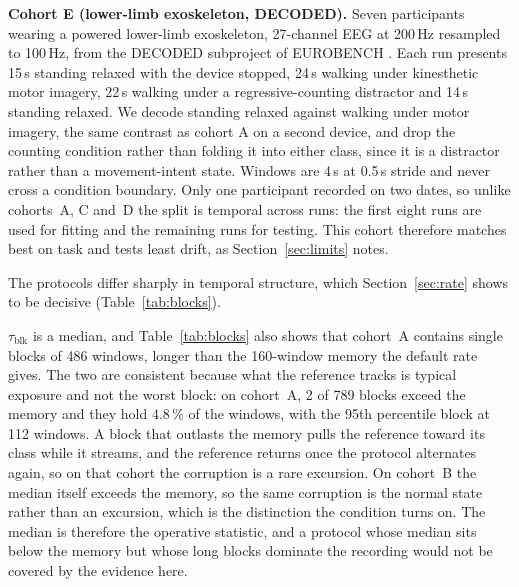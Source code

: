 \documentclass[a4paper,fleqn]{cas-dc}
\begin{document}
\textbf{Cohort E (lower-limb exoskeleton, DECODED).} Seven participants wearing a powered lower-limb exoskeleton, 27-channel EEG at 200\,Hz resampled to 100\,Hz, from the DECODED subproject of EUROBENCH \citep{decoded}. Each run presents 15\,s standing relaxed with the device stopped, 24\,s walking under kinesthetic motor imagery, 22\,s walking under a regressive-counting distractor and 14\,s standing relaxed. We decode standing relaxed against walking under motor imagery, the same contrast as cohort A on a second device, and drop the counting condition rather than folding it into either class, since it is a distractor rather than a movement-intent state. Windows are 4\,s at 0.5\,s stride and never cross a condition boundary. Only one participant recorded on two dates, so unlike cohorts~A, C and~D the split is temporal across runs: the first eight runs are used for fitting and the remaining runs for testing. This cohort therefore matches best on task and tests least drift, as Section~\ref{sec:limits} notes.

The protocols differ sharply in temporal structure, which
Section~\ref{sec:rate} shows to be decisive (Table~\ref{tab:blocks}).

$\tau_{\mathrm{blk}}$ is a median, and Table~\ref{tab:blocks} also shows that
cohort~A contains single blocks of 486 windows, longer than the 160-window
memory the default rate gives. The two are consistent because what the
reference tracks is typical exposure and not the worst block: on cohort~A, 2 of
789 blocks exceed the memory and they hold $4.8\,\%$ of the windows, with the
95th percentile block at 112 windows. A block that outlasts the memory pulls the
reference toward its class while it streams, and the reference returns once the
protocol alternates again, so on that cohort the corruption is a rare excursion.
On cohort~B the median itself exceeds the memory, so the same corruption is the
normal state rather than an excursion, which is the distinction the condition
turns on. The median is therefore the operative statistic, and a protocol whose
median sits below the memory but whose long blocks dominate the recording would
not be covered by the evidence here.
\end{document}
